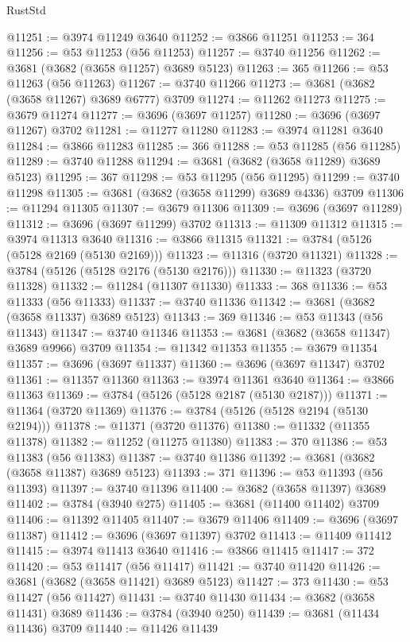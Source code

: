 \begin{lexlean}{RustStd}
\begin{coremodule}
@11251 := @3974 @11249 @3640
@11252 := @3866 @11251
@11253 := 364
@11256 := @53 @11253 (@56 @11253)
@11257 := @3740 @11256
@11262 := @3681 (@3682 (@3658 @11257) @3689 @5123)
@11263 := 365
@11266 := @53 @11263 (@56 @11263)
@11267 := @3740 @11266
@11273 := @3681 (@3682 (@3658 @11267) @3689 @6777) @3709
@11274 := @11262 @11273
@11275 := @3679 @11274
@11277 := @3696 (@3697 @11257)
@11280 := @3696 (@3697 @11267) @3702
@11281 := @11277 @11280
@11283 := @3974 @11281 @3640
@11284 := @3866 @11283
@11285 := 366
@11288 := @53 @11285 (@56 @11285)
@11289 := @3740 @11288
@11294 := @3681 (@3682 (@3658 @11289) @3689 @5123)
@11295 := 367
@11298 := @53 @11295 (@56 @11295)
@11299 := @3740 @11298
@11305 := @3681 (@3682 (@3658 @11299) @3689 @4336) @3709
@11306 := @11294 @11305
@11307 := @3679 @11306
@11309 := @3696 (@3697 @11289)
@11312 := @3696 (@3697 @11299) @3702
@11313 := @11309 @11312
@11315 := @3974 @11313 @3640
@11316 := @3866 @11315
@11321 := @3784 (@5126 (@5128 @2169 (@5130 @2169)))
@11323 := @11316 (@3720 @11321)
@11328 := @3784 (@5126 (@5128 @2176 (@5130 @2176)))
@11330 := @11323 (@3720 @11328)
@11332 := @11284 (@11307 @11330)
@11333 := 368
@11336 := @53 @11333 (@56 @11333)
@11337 := @3740 @11336
@11342 := @3681 (@3682 (@3658 @11337) @3689 @5123)
@11343 := 369
@11346 := @53 @11343 (@56 @11343)
@11347 := @3740 @11346
@11353 := @3681 (@3682 (@3658 @11347) @3689 @9966) @3709
@11354 := @11342 @11353
@11355 := @3679 @11354
@11357 := @3696 (@3697 @11337)
@11360 := @3696 (@3697 @11347) @3702
@11361 := @11357 @11360
@11363 := @3974 @11361 @3640
@11364 := @3866 @11363
@11369 := @3784 (@5126 (@5128 @2187 (@5130 @2187)))
@11371 := @11364 (@3720 @11369)
@11376 := @3784 (@5126 (@5128 @2194 (@5130 @2194)))
@11378 := @11371 (@3720 @11376)
@11380 := @11332 (@11355 @11378)
@11382 := @11252 (@11275 @11380)
@11383 := 370
@11386 := @53 @11383 (@56 @11383)
@11387 := @3740 @11386
@11392 := @3681 (@3682 (@3658 @11387) @3689 @5123)
@11393 := 371
@11396 := @53 @11393 (@56 @11393)
@11397 := @3740 @11396
@11400 := @3682 (@3658 @11397) @3689
@11402 := @3784 (@3940 @275)
@11405 := @3681 (@11400 @11402) @3709
@11406 := @11392 @11405
@11407 := @3679 @11406
@11409 := @3696 (@3697 @11387)
@11412 := @3696 (@3697 @11397) @3702
@11413 := @11409 @11412
@11415 := @3974 @11413 @3640
@11416 := @3866 @11415
@11417 := 372
@11420 := @53 @11417 (@56 @11417)
@11421 := @3740 @11420
@11426 := @3681 (@3682 (@3658 @11421) @3689 @5123)
@11427 := 373
@11430 := @53 @11427 (@56 @11427)
@11431 := @3740 @11430
@11434 := @3682 (@3658 @11431) @3689
@11436 := @3784 (@3940 @250)
@11439 := @3681 (@11434 @11436) @3709
@11440 := @11426 @11439

\end{coremodule}
\end{lexlean}
